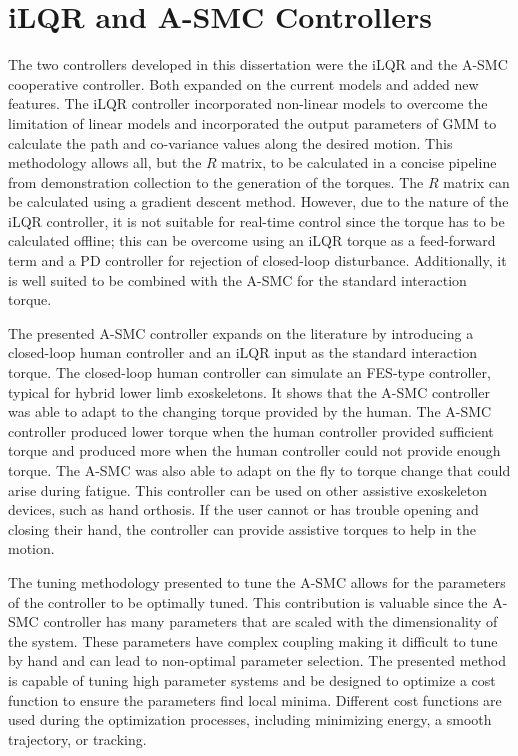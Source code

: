 \section{iLQR and A-SMC Controllers}

The two controllers developed in this dissertation were the iLQR and the A-SMC cooperative controller. Both expanded on the current models and added new features. The iLQR controller incorporated non-linear models to overcome the limitation of linear models and incorporated the output parameters of GMM to calculate the path and co-variance values along the desired motion. This methodology allows all, but the $R$ matrix, to be calculated in a concise pipeline from demonstration collection to the generation of the torques. The $R$ matrix can be calculated using a gradient descent method. However, due to the nature of the iLQR controller, it is not suitable for real-time control since the torque has to be calculated offline; this can be overcome using an iLQR torque as a feed-forward term and a PD controller for rejection of closed-loop disturbance. Additionally, it is well suited to be combined with the A-SMC for the standard interaction torque. 

The presented A-SMC controller expands on the literature by introducing a closed-loop human controller and an iLQR input as the standard interaction torque. The closed-loop human controller can simulate an FES-type controller, typical for hybrid lower limb exoskeletons. It shows that the A-SMC controller was able to adapt to the changing torque provided by the human. The A-SMC controller produced lower torque when the human controller provided sufficient torque and produced more when the human controller could not provide enough torque. The A-SMC was also able to adapt on the fly to torque change that could arise during fatigue. This controller can be used on other assistive exoskeleton devices, such as hand orthosis. If the user cannot or has trouble opening and closing their hand, the controller can provide assistive torques to help in the motion. 

The tuning methodology presented to tune the A-SMC allows for the 
parameters of the controller to be optimally tuned. This contribution is valuable since the A-SMC controller has many parameters that are scaled with the dimensionality of the system. These parameters have complex coupling making it difficult to tune by hand and can lead to non-optimal parameter selection. The presented method is capable of tuning high parameter systems and be designed to optimize a cost function to ensure the parameters find local minima. Different cost functions are used during the optimization processes, including minimizing energy,  a smooth trajectory, or tracking.   



